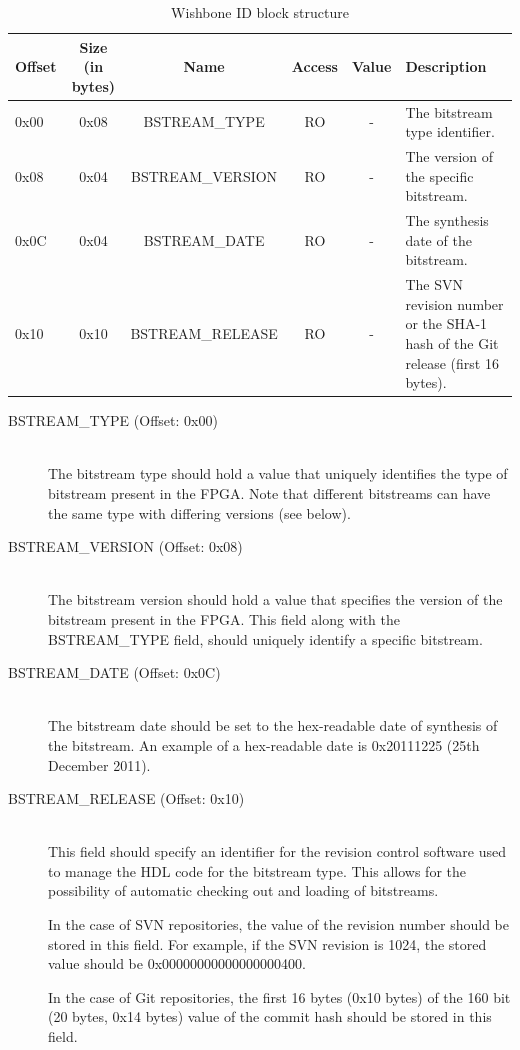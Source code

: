 \documentclass{article}
\begin{document}
\begin{center}
	\begin{savenotes}
	\begin{table}[!ht]\footnotesize
	\caption{Wishbone ID block structure}\label{id_block_struct}\centering
	\begin{tabular}{| l | c | c | c | c | p{5cm} |} \hline
	Offset & Size (in bytes) & Name & Access & Value & Description \\ \hline
	0x00 & 0x08 & BSTREAM\_TYPE & RO & - & The bitstream type identifier. \\ \hline
	0x08 & 0x04 & BSTREAM\_VERSION & RO & - & The version of the specific bitstream. \\ \hline
	0x0C & 0x04 & BSTREAM\_DATE & RO & - & The synthesis date of the bitstream. \\ \hline
	0x10 & 0x10 & BSTREAM\_RELEASE & RO & - & The SVN revision number or the SHA-1 hash of the Git release (first 16 bytes). \\ \hline
	\end{tabular}
	\end{table}
	\end{savenotes}
\end{center}

\begin{description}
\item[BSTREAM\_TYPE (Offset: 0x00)] \hfill \\
The bitstream type should hold a value that uniquely identifies the type of 
bitstream present in the FPGA. Note that different bitstreams can have the
same type with differing versions (see below).

\item[BSTREAM\_VERSION (Offset: 0x08)] \hfill \\
The bitstream version should hold a value that specifies the version of the
bitstream present in the FPGA. This field along with the BSTREAM\_TYPE field,
should uniquely identify a specific bitstream.

\item[BSTREAM\_DATE (Offset: 0x0C)] \hfill \\
The bitstream date should be set to the hex-readable date of synthesis of
the bitstream. An example of a hex-readable date is 0x20111225 (25th December
2011).

\item[BSTREAM\_RELEASE (Offset: 0x10)] \hfill \\
This field should specify an identifier for the revision control software
used to manage the HDL code for the bitstream type. This allows for the 
possibility of automatic checking out and loading of bitstreams.

In the case of SVN repositories, the value of the revision number should
be stored in this field. For example, if the SVN revision is 1024, the 
stored value should be 0x00000000000000000400.

In the case of Git repositories, the first 16 bytes (0x10 bytes) of the
160 bit (20 bytes, 0x14 bytes) value of the commit hash should be stored
in this field.

\end{description}
\end{document}
